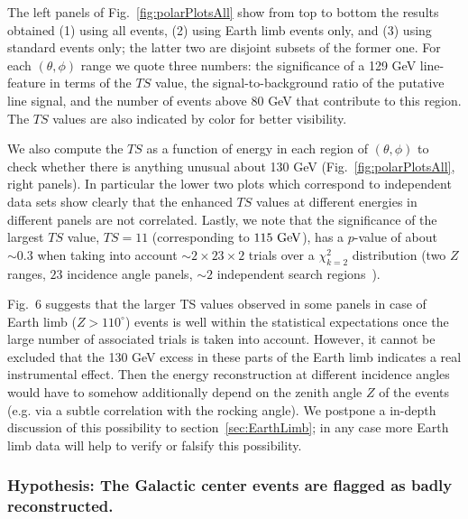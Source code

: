\documentclass[aps,twocolumn,prd,superscriptaddress,showpacs,nofootinbib,fixfloat]{revtex4}
\newcommand{\GeV}{{\rm ~GeV}}
\begin{document}
The left panels of Fig.~\ref{fig:polarPlotsAll} show from
top to bottom the results obtained (1) using all events, (2)
using Earth limb events only, and (3) using standard events
only; the latter two are disjoint subsets of the
former one. For each $(\theta, \phi)$ range we quote three
numbers: the significance of a 129 GeV line-feature in terms
of the $TS$ value, the signal-to-background ratio of the
putative line signal, and the number of events above 80 GeV
that contribute to this region. The $TS$ values are also
indicated by color for better visibility.


We also compute the $TS$ as a function of energy in each region of
$(\theta,\phi)$ to check whether there is anything unusual about 130 GeV
(Fig.~\ref{fig:polarPlotsAll}, right panels). In
particular the lower two plots which correspond to
independent data sets show clearly that the enhanced $TS$
values at different energies in different panels are not
correlated. Lastly, we note that the significance of the
largest $TS$ value, $TS=11$ (corresponding to $115\GeV$), has a $p$-value of
about $\sim0.3$ when taking into account
$\sim2\times23\times2$ trials over a $\chi_{k=2}^2$ distribution
(two $Z$ ranges, $23$ incidence angle panels, $\sim2$
independent search regions~\cite{Gross:2010qma}). 

Fig.~6 suggests that the larger TS values observed in some panels in case of
Earth limb ($Z>110^\circ$) events is well within the statistical expectations
once the large number of associated trials is taken into account.
However, it cannot be excluded that the 130 GeV excess in
these parts of the Earth limb indicates a real instrumental
effect. Then the energy
reconstruction at different incidence angles would have to somehow
additionally
depend on the zenith angle $Z$ of the events
(e.g. via a
subtle correlation with the rocking angle).
We postpone a in-depth discussion of this possibility to
section~\ref{sec:EarthLimb}; in any case more
Earth limb data will help to verify or falsify this possibility.

\subsubsection{Hypothesis: The Galactic center events are flagged as badly
reconstructed.}
\end{document}
